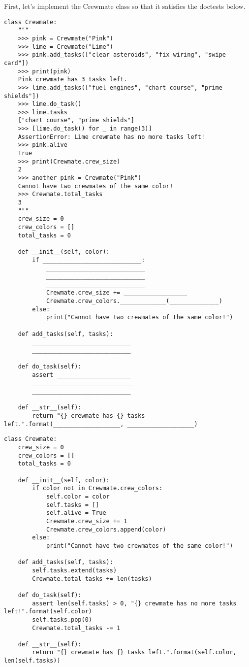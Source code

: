 \question First, let's implement the Crewmate class so that it satisfies the doctests below.
\begin{lstlisting}
class Crewmate:
    """
    >>> pink = Crewmate("Pink")
    >>> lime = Crewmate("Lime")
    >>> pink.add_tasks(["clear asteroids", "fix wiring", "swipe card"])
    >>> print(pink)
    Pink crewmate has 3 tasks left.
    >>> lime.add_tasks(["fuel engines", "chart course", "prime shields"])
    >>> lime.do_task()
    >>> lime.tasks
    ["chart course", "prime shields"]
    >>> [lime.do_task() for _ in range(3)]
    AssertionError: Lime crewmate has no more tasks left!
    >>> pink.alive
    True
    >>> print(Crewmate.crew_size)
    2
    >>> another_pink = Crewmate("Pink")
    Cannot have two crewmates of the same color!
    >>> Crewmate.total_tasks
    3
    """
    crew_size = 0
    crew_colors = []
    total_tasks = 0
    
    def __init__(self, color):
        if ____________________________:
            ____________________________
            ____________________________
            ____________________________
            Crewmate.crew_size += __________________
            Crewmate.crew_colors._____________(______________)
        else:
            print("Cannot have two crewmates of the same color!")
            
    def add_tasks(self, tasks):
        ____________________________
        ____________________________
    
    def do_task(self):
        assert _____________________
        ____________________________
        ____________________________
    
    def __str__(self):
        return "{} crewmate has {} tasks left.".format(___________________, ___________________)
\end{lstlisting}
\begin{solution}
\begin{lstlisting}
class Crewmate:
    crew_size = 0
    crew_colors = []
    total_tasks = 0
    
    def __init__(self, color):
        if color not in Crewmate.crew_colors:
            self.color = color
            self.tasks = []
            self.alive = True
            Crewmate.crew_size += 1
            Crewmate.crew_colors.append(color)
        else:
            print("Cannot have two crewmates of the same color!")
            
    def add_tasks(self, tasks):
        self.tasks.extend(tasks)
        Crewmate.total_tasks += len(tasks)
    
    def do_task(self):
        assert len(self.tasks) > 0, "{} crewmate has no more tasks left!".format(self.color)
        self.tasks.pop(0)
        Crewmate.total_tasks -= 1
    
    def __str__(self):
        return "{} crewmate has {} tasks left.".format(self.color, len(self.tasks))
\end{lstlisting}
\end{solution}

